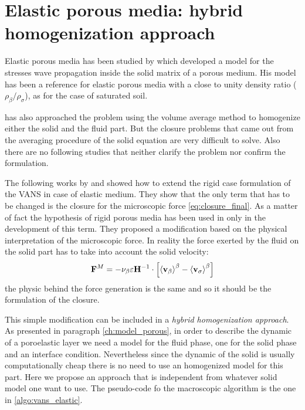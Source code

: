\section{Elastic porous media: hybrid homogenization approach}
\label{ph:moving}

Elastic porous media has been studied by \citet{biot1956theory} which developed a model for the stresses wave propagation inside the solid matrix of a porous medium.
His model has been a reference for elastic porous media with a close to unity density ratio ($\rho_{\beta}/\rho_{\sigma}$), as for the case of saturated soil.

\citet{whitaker1986deformable} has also approached the problem using the volume average method to homogenize either the solid and the fluid part.
But the closure problems that came out from the averaging procedure of the solid equation are very difficult to solve. Also there are no following studies that neither clarify the problem nor confirm the formulation.

The following works by \citet{hussong2011continuum} and \citet{wang2015volume} showed how to extend the rigid case formulation of the VANS in case of elastic medium.
They show that the only term that has to be changed is the closure for the microscopic force \eqref{eq:closure_final}. As a matter of fact the hypothesis of rigid porous media has been used in only in the development of this term.
They proposed a modification based on the physical interpretation of the microscopic force. In reality the force exerted by the fluid on the solid part has to take into account the solid velocity:
$$
\mathbf{F}^M = - \nu_{\beta} \varepsilon \mathbf{H}^{-1} \cdot \left[ {\left< \textbf{v}_{\beta} \right>}^{\beta} - {\left< \textbf{v}_{\sigma} \right>}^{\beta} \right]
$$
the physic behind the force generation is the same and so it should be the formulation of the closure.

This simple modification can be included in a \textit{hybrid homogenization approach}. As presented in paragraph \ref{ch:model_porous}, in order to describe the dynamic of a poroelastic layer we need a model for the fluid phase, one for the solid phase and an interface condition. Nevertheless since the dynamic of the solid is usually computationally cheap there is no need to use an homogenized model for this part. Here we propose an approach that is independent from whatever solid model one want to use. The pseudo-code fo the macroscopic algorithm is the one in \ref{algo:vans_elastic}.
\vspace{0.5cm}

